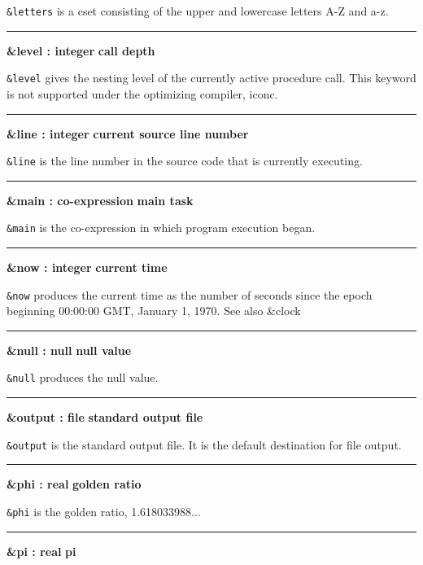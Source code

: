\noindent
{}\texttt{\&letters} is a cset consisting
of the upper and lowercase letters A-Z and a-z.

\bigskip\hrule\vspace{0.1cm}
\noindent
{\bf \&level : integer } \hfill {\bf call depth}

\noindent
{}\texttt{\&level} gives the nesting level of the
currently active procedure call. This keyword is not supported under
the optimizing compiler, iconc.

\bigskip\hrule\vspace{0.1cm}
\noindent
{\bf \&line : integer } \hfill {\bf current source line number}

\noindent
{}\texttt{\&line} is the line number in the
source code that is currently executing.

\bigskip\hrule\vspace{0.1cm}
\noindent
{\bf \&main : co{}-expression } \hfill {\bf main task}

\noindent
{}\texttt{\&main} is the co-expression in which program
execution began.

\bigskip\hrule\vspace{0.1cm}
\noindent
{\bf \&now : integer } \hfill {\bf current time}

\noindent
{}\texttt{\&now} produces the current time as the
number of seconds since the epoch beginning 00:00:00 GMT, January 1,
1970. See also \&clock

\bigskip\hrule\vspace{0.1cm}
\noindent
{\bf \&null : null } \hfill {\bf null value}

\noindent
{}\texttt{\&null} produces the null value.

\bigskip\hrule\vspace{0.1cm}
\noindent
{\bf \&output : file } \hfill {\bf standard output file}

\noindent
{}\texttt{\&output} is the standard
output file. It is the default destination for file output.

\bigskip\hrule\vspace{0.1cm}
\noindent
{\bf \&phi : real } \hfill {\bf golden ratio}

\noindent
{}\texttt{\&phi}
is the golden ratio, 1.618033988...

\bigskip\hrule\vspace{0.1cm}
\noindent
{\bf \&pi : real } \hfill {\bf pi}

